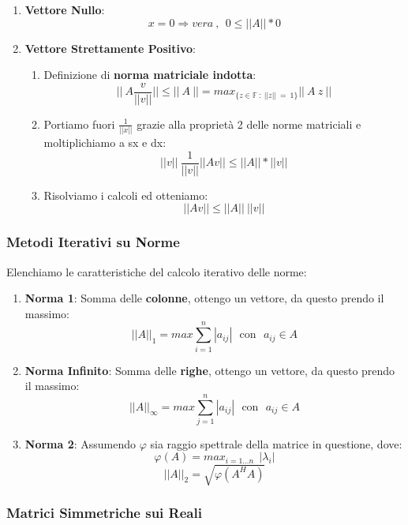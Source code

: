 \documentclass{article}
\begin{document}
\begin{enumerate}
    \item \textbf{Vettore Nullo}:
    \[ x=0 \Rightarrow vera \: , \: \: 0 \leq ||A|| * 0 \]
    \item \textbf{Vettore Strettamente Positivo}:
    \begin{enumerate}
        \item Definizione di \textbf{norma matriciale indotta}:
        \[ ||\:A\frac{v}{||v||}|| \leq ||\:A\:|| = max_{\{ z \in \mathbb{F} \: : \: ||z|| \: = \: 1 \}} ||\:A\:z\:|| \]
        \item Portiamo fuori $\frac{1}{||x||}$ grazie alla proprietà 2 delle norme matriciali e moltiplichiamo a sx e dx:
        \[ ||v||\:\frac{1}{||v||}||A{v}|| \leq ||A|| * ||v|| \]
        \item Risolviamo i calcoli ed otteniamo:
        \[ \boxed{ ||A{v}|| \leq ||A|| \: ||v|| } \] 
    \end{enumerate}
\end{enumerate}

\subsubsection{Metodi Iterativi su Norme}

Elenchiamo le caratteristiche del calcolo iterativo delle norme:

\begin{enumerate}
    \item \textbf{Norma 1}: Somma delle \textbf{colonne}, ottengo un vettore, da questo prendo il massimo:
    \[ \boxed{||A||_{1} = max\sum^{n}_{i=1}|a_{ij}| \: \: \: \text{con} \: \: \: a_{ij} \in A}\]
    \item \textbf{Norma Infinito}: Somma delle \textbf{righe}, ottengo un vettore, da questo prendo il massimo:
    \[ \boxed{||A||_{\infty} = max\sum^{n}_{j=1}|a_{ij}| \: \: \: \text{con} \: \: \: a_{ij} \in A}\]
    \item \textbf{Norma 2}: Assumendo $\varphi$ sia raggio spettrale della matrice in questione, dove: \[\varphi(A) = max_{i=1...n} \: \:|\lambda_{i}|\]
    \vspace*{3px}
    \[ \boxed{||A||_{2} = \sqrt{\varphi(A^{H}A)}} \]
\end{enumerate}

\newpage

\subsubsection{Matrici Simmetriche sui Reali}
\end{document}
